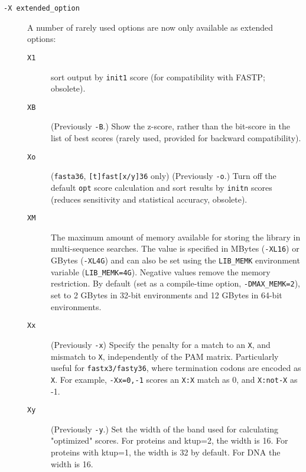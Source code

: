 \documentclass[11pt]{article}
\begin{document}
\begin{description}
\item[\texttt{-X extended\_option}]
A number of rarely used options are now only available as extended options:

\begin{description}

\item[\texttt{X1}] sort output by \texttt{init1} score (for
  compatibility with FASTP; obsolete).

\item[\texttt{XB}] (Previously \texttt{-B}.)  Show the z-score, rather
  than the bit-score in the list of best scores (rarely used, provided
  for backward compatibility).

\item[\texttt{Xo}] (\texttt{fasta36}, \texttt{[t]fast[x/y]36} only)
  (Previously \texttt{-o}.) Turn off the default \texttt{opt} score
  calculation and sort results by \texttt{initn} scores (reduces
  sensitivity and statistical accuracy, obsolete).

\item[\texttt{XM}] The maximum amount of memory available for storing
  the library in multi-sequence searches. The value is specified in
  MBytes (\texttt{-XL16}) or GBytes (\texttt{-XL4G}) and can also be
  set using the \texttt{LIB\_MEMK} environment variable
  (\texttt{LIB\_MEMK=4G}).  Negative values remove the memory
  restriction. By default (set as a compile-time option,
  \texttt{-DMAX\_MEMK=2}), set to 2 GBytes in 32-bit environments and
  12 GBytes in 64-bit environments.

\item[\texttt{Xx}] (Previously \texttt{-x}) Specify the penalty for a
  match to an \texttt{X}, and mismatch to \texttt{X}, independently of
  the PAM matrix.  Particularly useful for \texttt{fastx3/fasty36},
  where termination codons are encoded as \texttt{X}.  For example,
  \texttt{-Xx=0,-1} scores an \texttt{X:X} match as 0, and
  \texttt{X:not-X} as -1.

\item[\texttt{Xy}] (Previously \texttt{-y}.) Set the width of the band
  used for calculating "optimized" scores.  For proteins and ktup=2,
  the width is 16.  For proteins with ktup=1, the width is 32 by
  default.  For DNA the width is 16.

\end{description}


\end{description}
\end{document}
